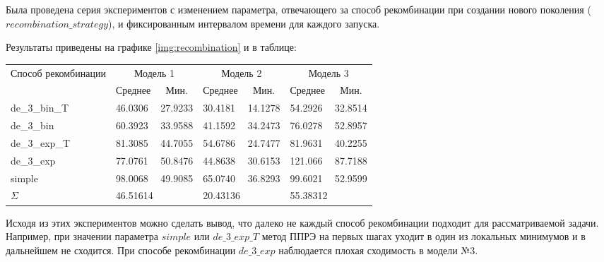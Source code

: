 \clearpage

Была проведена серия экспериментов с изменением параметра, отвечающего за 
способ рекомбинации при создании нового поколения ($recombination\_strategy$), 
и фиксированным интервалом времени для каждого запуска. 

Результаты приведены на графике \ref{img:recombination} и в таблице:

\begin{table}[h]
\centering
\def\arraystretch{1.5} %
\begin{tabular}{|l|llllll|}
\hline %
  \multirow{2}{*}{Способ рекомбинации} & 
  \multicolumn{2}{c|}{Модель 1} & 
  \multicolumn{2}{c|}{Модель 2} & 
  \multicolumn{2}{c|}{Модель 3} \\ \cline{2-7} 
  & 
  \multicolumn{1}{c|}{Среднее} & 
  \multicolumn{1}{c|}{Мин.} & 
  \multicolumn{1}{c|}{Среднее} & 
  \multicolumn{1}{c|}{Мин.} & 
  \multicolumn{1}{c|}{Среднее} & 
  \multicolumn{1}{c|}{Мин.} \\ 
\hline %
  de\_3\_bin\_T & 46.0306 & 27.9233 & 30.4181 & 14.1278 & 54.2926 & 32.8514 \\ \cline{1-1}
  de\_3\_bin    & 60.3923 & 33.9588 & 41.1592 & 34.2473 & 76.0278 & 52.8957 \\ \cline{1-1}
  de\_3\_exp\_T & 81.3085 & 44.7055 & 54.6786 & 24.7477 & 81.9631 & 40.2255 \\ \cline{1-1}
  de\_3\_exp    & 77.0761 & 50.8476 & 44.8638 & 30.6153 & 121.066 & 87.7188 \\ \cline{1-1}
  simple        & 98.0068 & 49.9085 & 65.0740 & 36.8293 & 99.6021 & 52.9599 \\
\hline %
  \multicolumn{1}{|l|}{$\Sigma$} & 
  \multicolumn{2}{l|}{46.51614} & 
  \multicolumn{2}{l|}{20.43136} & 
  \multicolumn{2}{l|}{55.38312} \\ 
\hline %
\end{tabular}
\end{table}

Исходя из этих экспериментов можно сделать вывод, что далеко не каждый
способ рекомбинации подходит для рассматриваемой задачи. Например, при 
значении параметра $simple$ или $de\_3\_exp\_T$ метод ППРЭ на первых шагах 
уходит в один из локальных минимумов и в дальнейшем не сходится. 
При способе рекомбинации $de\_3\_exp$ наблюдается плохая сходимость в модели №3.

